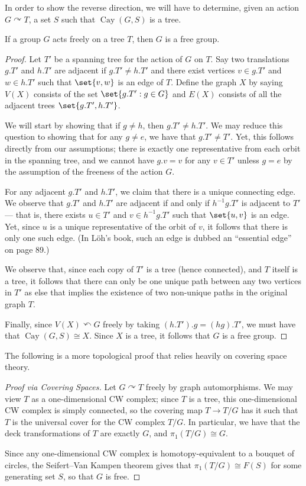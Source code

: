 \documentclass[10pt]{mypackage}
\begin{document}
In order to show the reverse direction, we will have to determine, given an action $G\curvearrowright T$, a set $S$ such that $\operatorname{Cay}\left( G,S \right)$ is a tree.
\begin{theorem}
  If a group $G$ acts freely on a tree $T$, then $G$ is a free group.
\end{theorem}
\begin{proof}
  Let $T'$ be a spanning tree for the action of $G$ on $T$. Say two translations $g.T'$ and $h.T'$ are adjacent if $g.T'\neq h.T'$ and there exist vertices $v\in g.T'$ and $w\in h.T'$ such that $\set{v,w}$ is an edge of $T$. Define the graph $X$ by saying $V(X)$ consists of the set $\set{g.T' : g\in G}$ and $E(X)$ consists of all the adjacent trees $\set{g.T',h.T'}$.

  We will start by showing that if $g\neq h$, then $g.T'\neq h.T'$. We may reduce this question to showing that for any $g\neq e$, we have that $g.T'\neq T'$. Yet, this follows directly from our assumptions; there is exactly one representative from each orbit in the spanning tree, and we cannot have $g.v = v$ for any $v\in T'$ unless $g = e$ by the assumption of the freeness of the action $G$.

  For any adjacent $g.T'$ and $h.T'$, we claim that there is a unique connecting edge. We observe that $g.T'$ and $h.T'$ are adjacent if and only if $h^{-1}g.T'$ is adjacent to $T'$ --- that is, there exists $u\in T'$ and $v\in h^{-1}g.T'$ such that $\set{u,v}$ is an edge. Yet, since $u$ is a unique representative of the orbit of $v$, it follows that there is only one such edge. (In Löh's book, such an edge is dubbed an ``essential edge'' on page 89.)

  We observe that, since each copy of $T'$ is a tree (hence connected), and $T$ itself is a tree, it follows that there can only be one unique path between any two vertices in $T'$ as else that implies the existence of two non-unique paths in the original graph $T$.

  Finally, since $V(X) \curvearrowleft G$ freely by taking $\left( h.T' \right).g = \left( hg \right).T'$, we must have that $\operatorname{Cay}\left( G,S \right)\cong X$. Since $X$ is a tree, it follows that $G$ is a free group.
\end{proof}
The following is a more topological proof that relies heavily on covering space theory.
\begin{proof}[Proof via Covering Spaces]
  Let $G\curvearrowright T$ freely by graph automorphisms. We may view $T$ as a one-dimensional CW complex; since $T$ is a tree, this one-dimensional CW complex is simply connected, so the covering map $T\rightarrow T/G$ has it such that $T$ is the universal cover for the CW complex $T/G$. In particular, we have that the deck transformations of $T$ are exactly $G$, and $\pi_1\left( T/G \right)\cong G$.

  Since any one-dimensional CW complex is homotopy-equivalent to a bouquet of circles, the Seifert--Van Kampen theorem gives that $\pi_1\left( T/G \right)\cong F(S)$ for some generating set $S$, so that $G$ is free.
\end{proof}
\end{document}
